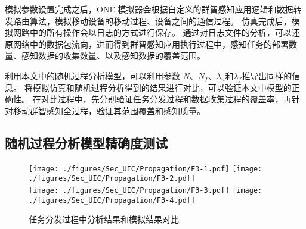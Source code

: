 模拟参数设置完成之后，ONE 模拟器会根据自定义的群智感知应用逻辑和数据转发路由算法，模拟移动设备的移动过程、设备之间的通信过程。
仿真完成后，模拟网路中的所有操作会以日志的方式进行保存。
通过对日志文件的分析，可以还原网络中的数据包流向，进而得到群智感知应用执行过程中，感知任务的部署数量、感知数据的收集数量、以及感知数据的覆盖范围。



利用本文中的随机过程分析模型，可以利用参数 $N$、$N_f$、$\lambda_n$和$\lambda_f$推导出同样的信息。
将模拟仿真和随机过程分析得到的结果进行对比，可以验证本文中模型的正确性。
在对比过程中，先分别验证任务分发过程和数据收集过程的覆盖率，再针对移动群智感知全过程，验证其范围覆盖和感知质量。


\subsection{随机过程分析模型精确度测试}

\begin{figure}[!h]
  \centering
  {\texttt{[image: ./figures/Sec\_UIC/Propagation/F3-1.pdf]}}
  {\texttt{[image: ./figures/Sec\_UIC/Propagation/F3-2.pdf]}}\\
  {\texttt{[image: ./figures/Sec\_UIC/Propagation/F3-3.pdf]}}
  {\texttt{[image: ./figures/Sec\_UIC/Propagation/F3-4.pdf]}}
  \vspace{-0.5em}
  \caption{任务分发过程中分析结果和模拟结果对比}
  \vspace{-0.5em}
  \label{Figure_PropagationTest}
\end{figure}

